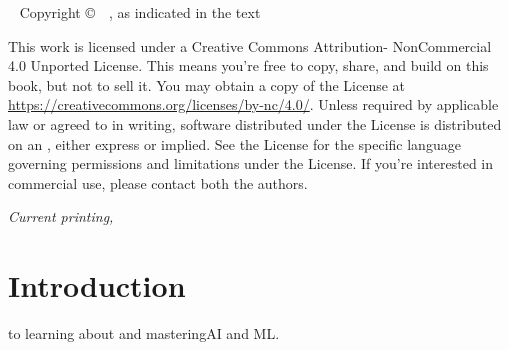 
\frontmatter

\blankpage


\maketitle


\newpage
\begin{fullwidth}
~\vfill
\thispagestyle{empty}
\setlength{\parindent}{0pt}
\setlength{\parskip}{\baselineskip}
Copyright \copyright\ \the\year\ \thanklessauthor, as indicated in the text


\par{}

\par
This work is licensed under a Creative Commons Attribution-
NonCommercial 4.0 Unported License. This means you're free to
copy, share, and build on this book, but not to sell it. 
You may obtain a copy
of the License at \url{https://creativecommons.org/licenses/by-nc/4.0/}. Unless
required by applicable law or agreed to in writing, software distributed
under the License is distributed on an , either express or implied. See the
License for the specific language governing permissions and limitations
under the License.
If you're interested in commercial use, please contact both the authors.

\par\textit{Current printing, \monthyear}
\end{fullwidth}

\tableofcontents

\listoffigures





\mainmatter

\chapter*{Introduction}


 to learning about and mastering\ac{AI} and  \ac{ML}.  


